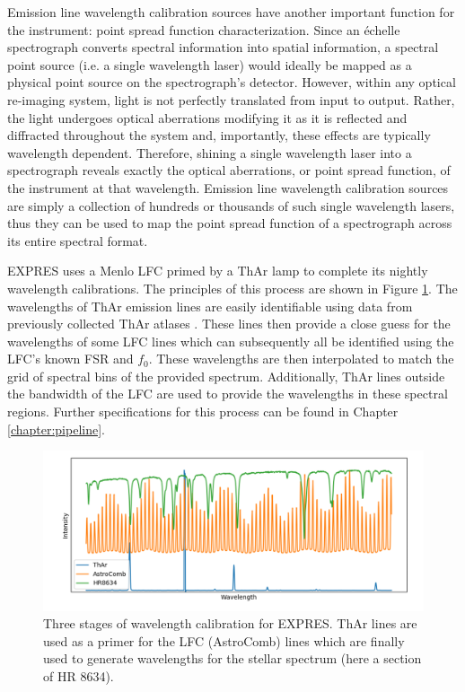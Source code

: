 Emission line wavelength calibration sources have another important function for the instrument: point spread function characterization. Since an \'echelle spectrograph converts spectral information into spatial information, a spectral point source (i.e. a single wavelength laser) would ideally be mapped as a physical point source on the spectrograph's detector. However, within any optical re-imaging system, light is not perfectly translated from input to output. Rather, the light undergoes optical aberrations modifying it as it is reflected and diffracted throughout the system and, importantly, these effects are typically wavelength dependent. Therefore, shining a single wavelength laser into a spectrograph reveals exactly the optical aberrations, or point spread function, of the instrument at that wavelength. Emission line wavelength calibration sources are simply a collection of hundreds or thousands of such single wavelength lasers, thus they can be used to map the point spread function of a spectrograph across its entire spectral format.

EXPRES uses a Menlo LFC primed by a ThAr lamp to complete its nightly wavelength calibrations. The principles of this process are shown in Figure \ref{fig:calibration}. The wavelengths of ThAr emission lines are easily identifiable using data from previously collected ThAr atlases \citep{palmer_atlas_1983, redman_spectrum_2014}. These lines then provide a close guess for the wavelengths of some LFC lines which can subsequently all be identified using the LFC's known FSR and $f_0$. These wavelengths are then interpolated to match the grid of spectral bins of the provided spectrum. Additionally, ThAr lines outside the bandwidth of the LFC are used to provide the wavelengths in these spectral regions. Further specifications for this process can be found in Chapter \ref{chapter:pipeline}.

\begin{figure}
    \centering
    \includegraphics[width=\textwidth]{figures-1/calibration.png}
    \caption{Three stages of wavelength calibration for EXPRES. ThAr lines are used as a primer for the LFC (AstroComb) lines which are finally used to generate wavelengths for the stellar spectrum (here a section of HR 8634).}
    \label{fig:calibration}
\end{figure}

